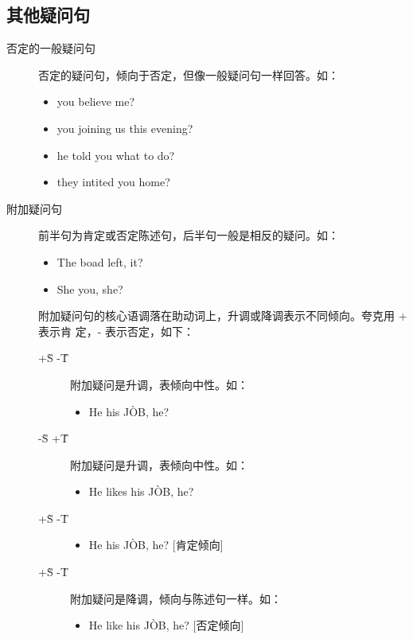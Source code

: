 \subsection{其他疑问句}
\begin{description}
\item[否定的一般疑问句] 否定的疑问句，倾向于否定，但像一般疑问句一样回答。如：
  \begin{itemize}
  \item {} you believe me?

  \item {} you joining us this evening?

  \item {} he told you what to do?

  \item {} they  intited you home?
  \end{itemize}
\item[附加疑问句] 前半句为肯定或否定陈述句，后半句一般是相反的疑问。如：
  \begin{itemize}
  \item The boad  left,  it?
  \item She  you,  she?
  \end{itemize}

  附加疑问句的核心语调落在助动词上，升调或降调表示不同倾向。夸克用 + 表示肯
  定，- 表示否定，如下：
  \begin{description}
  \item[+\`S -\'T] 附加疑问是升调，表倾向中性。如：
    \begin{itemize}
    \item He  his J\`OB,  he?
    \end{itemize}
  \item[-\`S +\'T] 附加疑问是升调，表倾向中性。如：
    \begin{itemize}
    \item He  likes his J\`OB,  he?
    \end{itemize}
  \item[+\`S -\`T]
    \begin{itemize} 附加疑问是降调，倾向与陈述句一样。如：
    \item He  his J\`OB,  he? [肯定倾向]
    \end{itemize}
  \item[+\`S -\`T] 附加疑问是降调，倾向与陈述句一样。如：
    \begin{itemize}
    \item He  like his J\`OB,  he? [否定倾向]
    \end{itemize}


\end{description}
\end{description}
